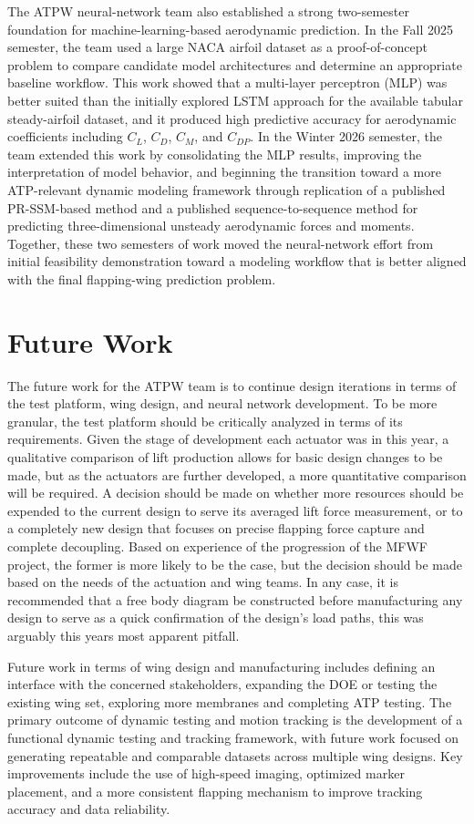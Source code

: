 The ATPW neural-network team also established a strong two-semester foundation for machine-learning-based aerodynamic prediction. In the Fall 2025 semester, the team used a large NACA airfoil dataset as a proof-of-concept problem to compare candidate model architectures and determine an appropriate baseline workflow. This work showed that a multi-layer perceptron (MLP) was better suited than the initially explored LSTM approach for the available tabular steady-airfoil dataset, and it produced high predictive accuracy for aerodynamic coefficients including $C_L$, $C_D$, $C_M$, and $C_{DP}$. In the Winter 2026 semester, the team extended this work by consolidating the MLP results, improving the interpretation of model behavior, and beginning the transition toward a more ATP-relevant dynamic modeling framework through replication of a published PR-SSM-based method and a published sequence-to-sequence method for predicting three-dimensional unsteady aerodynamic forces and moments. Together, these two semesters of work moved the neural-network effort from initial feasibility demonstration toward a modeling workflow that is better aligned with the final flapping-wing prediction problem.


\section{Future Work}
The future work for the ATPW team is to continue design iterations in terms of the test platform, wing design, and neural network development. To be more granular, the test platform should be critically analyzed in terms of its requirements. Given the stage of development each actuator was in this year, a qualitative comparison of lift production allows for basic design changes to be made, but as the actuators are further developed, a more quantitative comparison will be required. A decision should be made on whether more resources should be expended to the current design to serve its averaged lift force measurement, or to a completely new design that focuses on precise flapping force capture and complete decoupling. Based on experience of the progression of the MFWF project, the former is more likely to be the case, but the decision should be made based on the needs of the actuation and wing teams. In any case, it is recommended that a free body diagram be constructed before manufacturing any design to serve as a quick confirmation of the design's load paths, this was arguably this years most apparent pitfall.

Future work in terms of wing design and manufacturing includes defining an interface with the concerned stakeholders, expanding the DOE or testing the existing wing set, exploring more membranes and completing ATP testing. The primary outcome of dynamic testing and motion tracking is the development of a functional dynamic testing and tracking framework, with future work focused on generating repeatable and comparable datasets across multiple wing designs. Key improvements include the use of high-speed imaging, optimized marker placement, and a more consistent flapping mechanism to improve tracking accuracy and data reliability.

